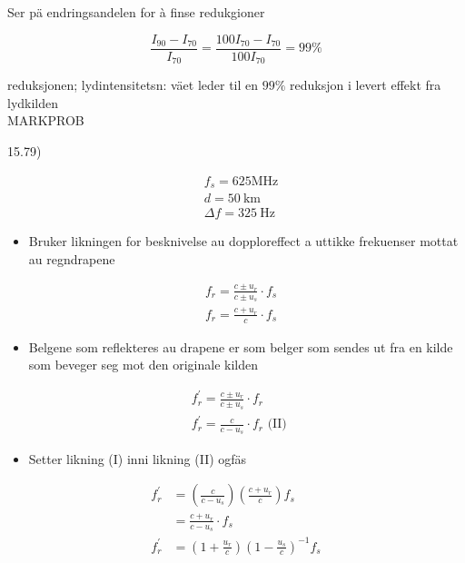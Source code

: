 \documentclass[10pt]{article}
\begin{document}
Ser pä endringsandelen for à finse redukgioner

$$
\frac{I_{90}-I_{70}}{I_{70}}=\frac{100 I_{70}-I_{70}}{100 I_{70}}=99 \%
$$

reduksjonen; lydintensitetsn: väet leder til en $99 \%$ reduksjon i levert effekt fra lydkilden\\

MARKPROB

15.79)

$$
\begin{aligned}
& f_{s}=625 \mathrm{MHz} \\
& d=50 \mathrm{~km} \\
& \Delta f=325 \mathrm{~Hz}
\end{aligned}
$$

\begin{itemize}
  \item Bruker likningen for besknivelse au dopploreffect a uttikke frekuenser mottat au regndrapene
\end{itemize}


\begin{align*}
& f_{r}=\frac{c \pm u_{r}}{c \pm u_{s}} \cdot f_{s} \\
& f_{r}=\frac{c+u_{r}}{c} \cdot f_{s} \tag{I}
\end{align*}


\begin{itemize}
  \item Belgene som reflekteres au drapene er som belger som sendes ut fra en kilde som beveger seg mot den originale kilden
\end{itemize}

$$
\begin{aligned}
& f_{r}^{\prime}=\frac{c \pm u_{r}}{c \pm u_{s}} \cdot f_{r} \\
& f_{r}^{\prime}=\frac{c}{c-u_{s}} \cdot f_{r} \text { (II) }
\end{aligned}
$$

\begin{itemize}
  \item Setter likning (I) inni likning (II) ogfäs
\end{itemize}

$$
\begin{aligned}
f_{r}^{\prime} & =\left(\frac{c}{c-u_{s}}\right)\left(\frac{c+u_{r}}{c}\right) f_{s} \\
& =\frac{c+u_{r}}{c-u_{s}} \cdot f_{s} \\
f_{r}^{\prime} & =\left(1+\frac{u_{r}}{c}\right)\left(1-\frac{u_{s}}{c}\right)^{-1} f_{s}
\end{aligned}
$$
\end{document}
